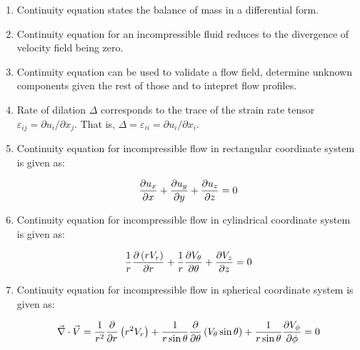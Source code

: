 \begin{enumerate}

\item Continuity equation states the balance of mass in a differential form.
 
\item Continuity equation for an incompressible fluid reduces to the divergence of velocity field being zero.

\item Continuity equation can be used to validate a flow field, determine unknown components given the rest of those and to intepret flow profiles.

\item Rate of dilation $\Delta$ corresponds to the trace of the strain rate tensor $\varepsilon_{ij} = \partial u_i / \partial x_j$. That is, $\Delta = \varepsilon_{ii} = \partial u_i / \partial x_i$.

\item Continuity equation for incompressible flow in rectangular coordinate system is given as: 

$$ {\partial u_x \over \partial x} + {\partial u_y \over \partial y} + {\partial u_z \over \partial z} = 0 $$

\item Continuity equation for incompressible flow in cylindrical coordinate system is given as: 

$$ {1 \over r} {\partial \left( r V_r \right) \over \partial r} +  {1 \over r} {\partial V_\theta \over \partial \theta} + {\partial V_z \over \partial z} = 0 $$

\item Continuity equation for incompressible flow in spherical coordinate system is given as: 

$$ \vec{\nabla} \cdot \vec{V} = {1 \over r^2} {\partial \over \partial r} \left( r^2 V_r \right) + {1 \over r \sin\theta} {\partial \over \partial \theta} \left( V_\theta \sin\theta \right) + {1 \over r \sin\theta} {\partial V_\phi \over \partial \phi} = 0 $$


\end{enumerate}

